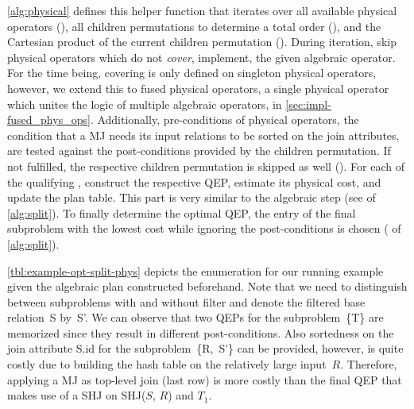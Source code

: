 \autoref{alg:physical} defines this helper function that iterates over all available physical operators (), all children permutations to determine a total order (), and the Cartesian product of the current children permutation ().  During iteration,  skip physical operators which do not \emph{cover}, \ie implement, the given algebraic operator.  For the time being, covering is only defined on singleton physical operators, however, we extend this to fused physical operators, \ie a single physical operator which unites the logic of multiple algebraic operators, in \autoref{sec:impl-fused_phys_ops}.  Additionally, pre-conditions of physical operators, \eg the condition that a MJ needs its input relations to be sorted on the join attributes, are tested against the post-conditions provided by the children permutation.  If not fulfilled, the respective children permutation is skipped as well ().  For each of the qualifying ,  construct the respective QEP, estimate its physical cost, and update the plan table.  This part is very similar to the algebraic step (see  of \autoref{alg:split}).  To finally determine the optimal QEP, the entry of the final subproblem with the lowest cost while ignoring the post-conditions is chosen ( of \autoref{alg:split}).

\autoref{tbl:example-opt-split-phys} depicts the enumeration for our running example given the algebraic plan constructed beforehand.  Note that we need to distinguish between subproblems with and without filter and denote the filtered base relation~S by~S'.  We can observe that two QEPs for the subproblem~\{T\} are memorized since they result in different post-conditions.  Also sortedness on the join attribute S.id for the subproblem~\{R,~S'\} can be provided, however, is quite costly due to building the hash table on the relatively large input~$R$.  Therefore, applying a MJ as top-level join (last row) is more costly than the final QEP that makes use of a SHJ on SHJ($S$, $R$) and $T_1$.

